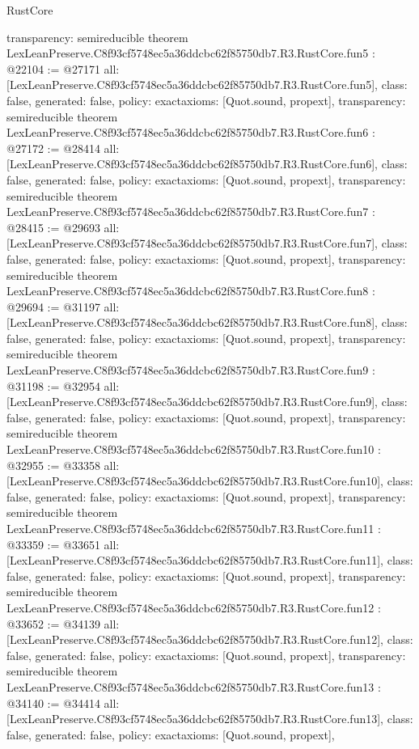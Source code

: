 \begin{lexlean}{RustCore}
\begin{coremodule}
{  transparency: semireducible
}
theorem LexLeanPreserve.C8f93cf5748ec5a36ddcbc62f85750db7.R3.RustCore.fun5 : @22104 := @27171 {
  all: [LexLeanPreserve.C8f93cf5748ec5a36ddcbc62f85750db7.R3.RustCore.fun5],
  class: false,
  generated: false,
  policy: exact{axioms: [Quot.sound, propext]},
  transparency: semireducible
}
theorem LexLeanPreserve.C8f93cf5748ec5a36ddcbc62f85750db7.R3.RustCore.fun6 : @27172 := @28414 {
  all: [LexLeanPreserve.C8f93cf5748ec5a36ddcbc62f85750db7.R3.RustCore.fun6],
  class: false,
  generated: false,
  policy: exact{axioms: [Quot.sound, propext]},
  transparency: semireducible
}
theorem LexLeanPreserve.C8f93cf5748ec5a36ddcbc62f85750db7.R3.RustCore.fun7 : @28415 := @29693 {
  all: [LexLeanPreserve.C8f93cf5748ec5a36ddcbc62f85750db7.R3.RustCore.fun7],
  class: false,
  generated: false,
  policy: exact{axioms: [Quot.sound, propext]},
  transparency: semireducible
}
theorem LexLeanPreserve.C8f93cf5748ec5a36ddcbc62f85750db7.R3.RustCore.fun8 : @29694 := @31197 {
  all: [LexLeanPreserve.C8f93cf5748ec5a36ddcbc62f85750db7.R3.RustCore.fun8],
  class: false,
  generated: false,
  policy: exact{axioms: [Quot.sound, propext]},
  transparency: semireducible
}
theorem LexLeanPreserve.C8f93cf5748ec5a36ddcbc62f85750db7.R3.RustCore.fun9 : @31198 := @32954 {
  all: [LexLeanPreserve.C8f93cf5748ec5a36ddcbc62f85750db7.R3.RustCore.fun9],
  class: false,
  generated: false,
  policy: exact{axioms: [Quot.sound, propext]},
  transparency: semireducible
}
theorem LexLeanPreserve.C8f93cf5748ec5a36ddcbc62f85750db7.R3.RustCore.fun10 : @32955 := @33358 {
  all: [LexLeanPreserve.C8f93cf5748ec5a36ddcbc62f85750db7.R3.RustCore.fun10],
  class: false,
  generated: false,
  policy: exact{axioms: [Quot.sound, propext]},
  transparency: semireducible
}
theorem LexLeanPreserve.C8f93cf5748ec5a36ddcbc62f85750db7.R3.RustCore.fun11 : @33359 := @33651 {
  all: [LexLeanPreserve.C8f93cf5748ec5a36ddcbc62f85750db7.R3.RustCore.fun11],
  class: false,
  generated: false,
  policy: exact{axioms: [Quot.sound, propext]},
  transparency: semireducible
}
theorem LexLeanPreserve.C8f93cf5748ec5a36ddcbc62f85750db7.R3.RustCore.fun12 : @33652 := @34139 {
  all: [LexLeanPreserve.C8f93cf5748ec5a36ddcbc62f85750db7.R3.RustCore.fun12],
  class: false,
  generated: false,
  policy: exact{axioms: [Quot.sound, propext]},
  transparency: semireducible
}
theorem LexLeanPreserve.C8f93cf5748ec5a36ddcbc62f85750db7.R3.RustCore.fun13 : @34140 := @34414 {
  all: [LexLeanPreserve.C8f93cf5748ec5a36ddcbc62f85750db7.R3.RustCore.fun13],
  class: false,
  generated: false,
  policy: exact{axioms: [Quot.sound, propext]},
}
\end{coremodule}
\end{lexlean}
